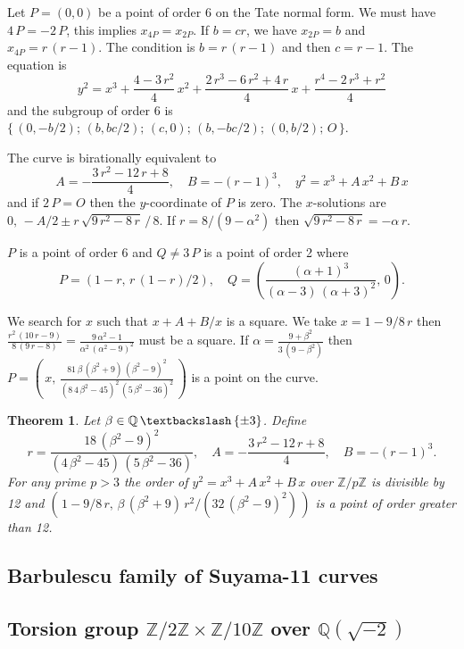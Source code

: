 \documentclass[a4paper, 11pt, pdftex]{report}
\theoremstyle{plain}
\newtheorem{theorem}{Theorem}[chapter]
\theoremstyle{definition}
\begin{document}
Let $P = (0, 0)$ be a point of order 6 on the Tate normal form. We must have $4\,P = -2\,P$,
this implies $x_{4P} = x_{2P}$. If $b = cr$, we have $x_{2P} = b$ and $x_{4P} = r\,(r - 1)$.
The condition is $b = r\,(r - 1)$ and then $c = r - 1$. The equation is
$$y^2 = x^3 + \frac{4 - 3\,r^2}{4}\, x^2 + \frac{2\,r^3 - 6\,r^2 + 4\,r}{4}\, x
 + \frac{r^4 - 2\,r^3 + r^2}{4}$$
and the subgroup of order 6 is $\{\,(0, -b/2);\, (b, bc/2);\, (c, 0);\, (b, -bc/2);\, (0, b/2);\, O\, \}$.

The curve is birationally equivalent to
$$A = -\frac{3\,r^2 - 12\,r + 8}{4},\quad B = -(r-1)^3,\quad y^2 = x^3 + A\,x^2 + B\,x$$
and if $2\,P = O$ then the $y$-coordinate of $P$ is zero. The $x$-solutions are
$0,\, -A/2 \pm r\,\sqrt{9\,r^2 - 8\,r}\,/\,8$.
If $r = 8/(9 - \alpha^2)$ then $\sqrt{9\,r^2 - 8\,r} = -\alpha\,r$.

$P$ is a point of order 6 and $Q \neq 3\,P$ is a point of order 2 where
$$P = \left(1 - r,\, r\,(1 - r) / 2\right),\quad
  Q = \left(\frac{(\alpha + 1)^3}{(\alpha - 3)\,(\alpha + 3)^2},\, 0\right).$$
  
We search for $x$ such that $x + A + B / x$ is a square. We take $x = 1 - 9/8\,r$ then
$\frac{r^2\,(10\,r - 9)}{8\,(9\,r - 8)} = \frac{9\,\alpha^2 - 1}{\alpha^2\, (\alpha^2 - 9)^2}$
must be a square. If $\alpha = \frac{9 + \beta^2}{3\,(9 - \beta^2)}$ then
$P = \left(\,x,\, \frac{81\, \beta\, (\beta^2 + 9)\, (\beta^2 - 9)^2}{(8\, 4\,\beta^2 - 45)^2\, (5\,\beta^2 - 36)^2}\,\right)$ is a point on the curve.

\begin{theorem} \label{Th_2x6}
Let $\beta \in \mathbb{Q}\, \textbackslash \, \{\pm3\}$. Define
$$r = \frac{18\, (\beta^2 - 9)^2}{(4\, \beta^2 - 45)\, (5\,\beta^2 - 36)},\quad
A = -\frac{3\,r^2 - 12\,r + 8}{4},\quad B = -(r-1)^3.$$
For any prime $p > 3$ the order of $y^2 = x^3 + A\, x^2 + B\, x$
over $\mathbb{Z}/p\mathbb{Z}$ is divisible by 12 and $\left(\,1 - 9/8\,r,\,
\beta\, (\beta^2 + 9)\, r^2 / (32\, (\beta^2 - 9)^2)\,\right)$
is a point of order greater than 12.
\end{theorem}

\subsection{Barbulescu family of Suyama-11 curves}

\subsection{Torsion group $\mathbb{Z}/2\mathbb{Z} \times \mathbb{Z}/10\mathbb{Z}$ over $\mathbb{Q}(\sqrt{-2})$}
\end{document}
